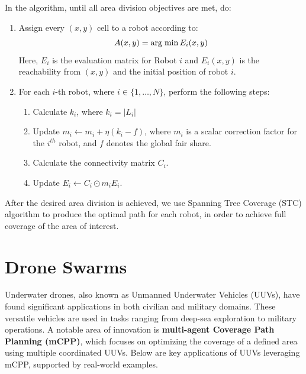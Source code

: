 In the algorithm, until all area division objectives are met, do:
\begin{enumerate}
	\item Assign every \((x, y)\) cell to a robot according to:
	\[
	A(x, y) = \operatorname*{arg\;min} E_i(x, y)
	\]
	Here, $E_i$ is the evaluation matrix for Robot $i$ and  $E_i(x, y)$  is the reachability from $(x, y)$ and the initial position of robot $i$.
	\item For each \(i\)-th robot, where \(i \in \{1, \ldots, N\}\), perform the following steps:
	\begin{enumerate}
		\item Calculate \(k_i\), where $k_i = \lvert L_i \rvert$
		\item Update \(m_i \gets m_i + \eta(k_i - f)\), where $m_i$ is a scalar correction factor for the $i^{th}$ robot, and $f$ denotes the global fair share.
		\item Calculate the connectivity matrix \(C_i\).
		\item Update \(E_i \gets C_i \odot m_i E_i\).
	\end{enumerate}
\end{enumerate}

After the desired area division is achieved, we use Spanning Tree Coverage (STC) algorithm to produce the optimal path for each robot, in order to achieve full coverage of the area of interest.

\section{Drone Swarms}
\label{DroneSwarms}

Underwater drones, also known as Unmanned Underwater Vehicles (UUVs), have found significant applications in both civilian and military domains. These versatile vehicles are used in tasks ranging from deep-sea exploration to military operations. A notable area of innovation is \textbf{multi-agent Coverage Path Planning (mCPP)}, which focuses on optimizing the coverage of a defined area using multiple coordinated UUVs. Below are key applications of UUVs leveraging mCPP, supported by real-world examples.

